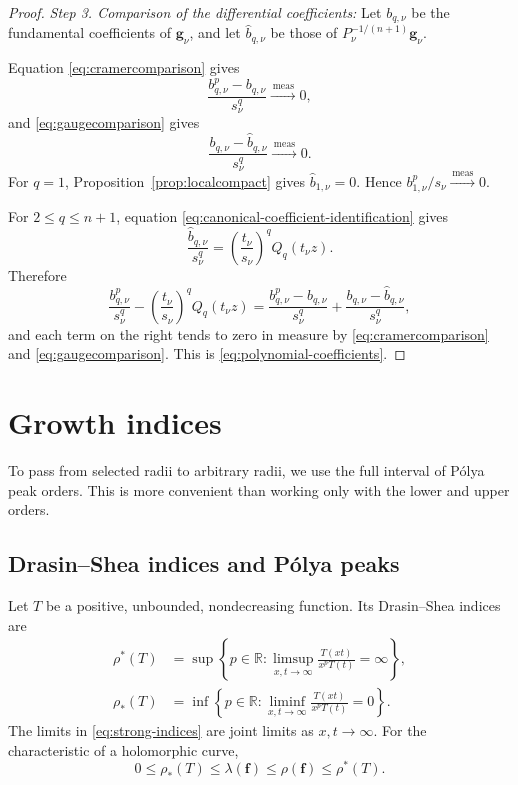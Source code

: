 \documentclass[12pt,letterpaper,reqno]{amsart}
\theoremstyle{definition}
\numberwithin{equation}{section}
\newcommand{\R}{\mathbb R}
\newcommand{\convmeas}{\xrightarrow{\,\mathrm{meas}\,}}
\newcommand{\fv}{\bm f}
\newcommand{\gv}{\bm g}
\begin{document}
\begin{proof}
\emph{{Step 3. Comparison of the differential coefficients:}}
Let \(b_{q,\nu}\) be the fundamental coefficients of \(\gv_\nu\), and
let \(\widehat b_{q,\nu}\) be those of
\(P_\nu^{-1/(n+1)}\gv_\nu\).

Equation \eqref{eq:cramercomparison} gives
\[
 \frac{b_{q,\nu}^p-b_{q,\nu}}{s_\nu^q}
 \convmeas0,
\]
and \eqref{eq:gaugecomparison} gives
\[
 \frac{b_{q,\nu}-\widehat b_{q,\nu}}{s_\nu^q}
 \convmeas0.
\]
For \(q=1\), Proposition~\ref{prop:localcompact} gives
\(\widehat b_{1,\nu}=0\). Hence
\(b_{1,\nu}^p/s_\nu\convmeas0\).

For \(2\leq q\leq n+1\), equation
\eqref{eq:canonical-coefficient-identification} gives
\[
 \frac{\widehat b_{q,\nu}}{s_\nu^q}
 =
 \left(\frac{t_\nu}{s_\nu}\right)^qQ_q(t_\nu z).
\]
Therefore
\[
 \frac{b_{q,\nu}^p}{s_\nu^q}
 -
 \left(\frac{t_\nu}{s_\nu}\right)^qQ_q(t_\nu z)
 =
 \frac{b_{q,\nu}^p-b_{q,\nu}}{s_\nu^q}
 +
 \frac{b_{q,\nu}-\widehat b_{q,\nu}}{s_\nu^q},
\]
and each term on the right tends to zero in measure by
\eqref{eq:cramercomparison} and \eqref{eq:gaugecomparison}. This is
\eqref{eq:polynomial-coefficients}.
\end{proof}
\section{Growth indices}\label{sec:indices}

To pass from selected radii to arbitrary radii, we use the full interval
of P\'olya peak orders. This is more convenient than working only with
the lower and upper orders.

\subsection{Drasin--Shea indices and P\'olya peaks}
\label{sec:polya-peaks}

Let \(T\) be a positive, unbounded, nondecreasing function. Its
Drasin--Shea indices \cite{DS72} are
\begin{equation}\label{eq:strong-indices}
\begin{split}
 \rho^*(T)
 &=
 \sup\left\{
 p\in\R:
 \limsup_{x,t\to\infty}
 \frac{T(xt)}{x^pT(t)}
 =
 \infty
 \right\},\\
 \rho_*(T)
 &=
 \inf\left\{
 p\in\R:
 \liminf_{x,t\to\infty}
 \frac{T(xt)}{x^pT(t)}
 =
 0
 \right\}.
\end{split}
\end{equation}
The limits in \eqref{eq:strong-indices} are joint limits as
\(x,t\to\infty\). For the characteristic of a holomorphic curve,
\[
0\leq
\rho_*(T)
\leq
\lambda(\fv)
\leq
\rho(\fv)
\leq
\rho^*(T).
\]
\end{document}
